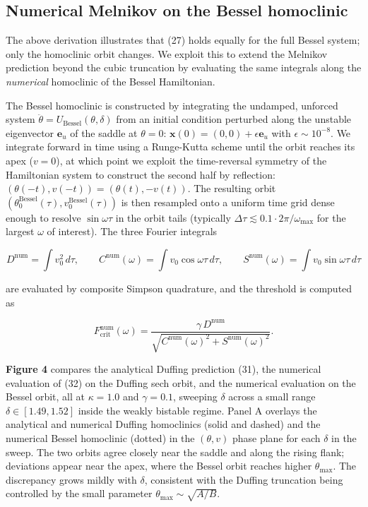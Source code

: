 \documentclass[11pt]{article}
\begin{document}
\subsection{Numerical Melnikov on the Bessel homoclinic}

The above derivation illustrates that (27) holds equally for the full Bessel system; only the homoclinic orbit changes. We exploit this to extend the Melnikov prediction beyond the cubic truncation by evaluating the same integrals along the \textit{numerical} homoclinic of the Bessel Hamiltonian.

The Bessel homoclinic is constructed by integrating the undamped, unforced system $\ddot\theta = U_{\text{Bessel}}(\theta, \delta)$ from an initial condition perturbed along the unstable eigenvector $\mathbf{e}_u$ of the saddle at $\theta = 0$: $\mathbf{x}(0) = (0, 0) + \epsilon\mathbf{e}_u$ with $\epsilon \sim 10^{-8}$. We integrate forward in time using a Runge-Kutta scheme until the orbit reaches its apex ($v = 0$), at which point we exploit the time-reversal symmetry of the Hamiltonian system to construct the second half by reflection: $(\theta(-t), v(-t)) = (\theta(t), -v(t))$. The resulting orbit $(\theta_0^{\text{Bessel}}(\tau), v_0^{\text{Bessel}}(\tau))$ is then resampled onto a uniform time grid dense enough to resolve $\sin\omega\tau$ in the orbit tails (typically $\Delta\tau \lesssim 0.1 \cdot 2\pi/\omega_{\max}$ for the largest $\omega$ of interest). The three Fourier integrals

\begin{equation*}
D^{\text{num}} = \int v_0^2\,d\tau, \qquad C^{\text{num}}(\omega) = \int v_0\cos\omega\tau\,d\tau, \qquad S^{\text{num}}(\omega) = \int v_0\sin\omega\tau\,d\tau
\end{equation*}

are evaluated by composite Simpson quadrature, and the threshold is computed as

\begin{equation}
F^{\text{num}}_{\text{crit}}(\omega) = \frac{\gamma\, D^{\text{num}}}{\sqrt{C^{\text{num}}(\omega)^2 + S^{\text{num}}(\omega)^2}}.
\end{equation}

\textbf{Figure 4} compares the analytical Duffing prediction (31), the numerical evaluation of (32) on the Duffing sech orbit, and the numerical evaluation on the Bessel orbit, all at $\kappa = 1.0$ and $\gamma = 0.1$, sweeping $\delta$ across a small range $\delta \in [1.49, 1.52]$ inside the weakly bistable regime. Panel A overlays the analytical and numerical Duffing homoclinics (solid and dashed) and the numerical Bessel homoclinic (dotted) in the $(\theta, v)$ phase plane for each $\delta$ in the sweep. The two orbits agree closely near the saddle and along the rising flank; deviations appear near the apex, where the Bessel orbit reaches higher $\theta_{\max}$. The discrepancy grows mildly with $\delta$, consistent with the Duffing truncation being controlled by the small parameter $\theta_{\max} \sim \sqrt{A/B}$.
\end{document}
